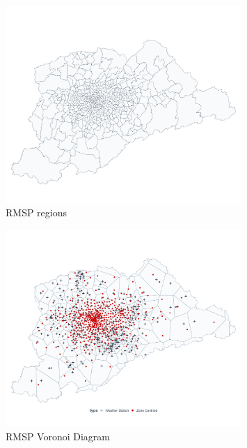 \begin{figure}[H]
    \centering
    \includegraphics[width=0.8\textwidth]{../figures/rmsp_base.png}
    \caption{RMSP regions}
    \label{fig:rmsp_base}
\end{figure}

\begin{figure}[H]
    \centering
    \includegraphics[width=0.8\textwidth]{../figures/rmsp_voronoi.png}
    \caption{RMSP Voronoi Diagram}
    \label{fig:rmsp_voronoi}
\end{figure}








\cite{branco2021AmericanJAgriEconomics}